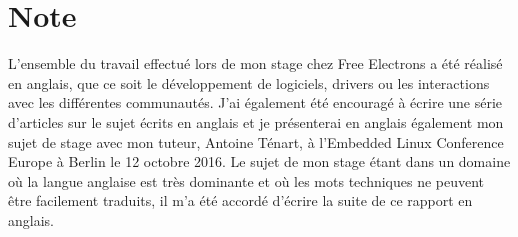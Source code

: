 \chapter*{Note}

L'ensemble du travail effectué lors de mon stage chez Free Electrons a été réalisé en anglais, que ce soit le développement de logiciels, drivers ou les interactions avec les différentes communautés. J'ai également été encouragé à écrire une série d'articles sur le sujet écrits en anglais et je présenterai en anglais également mon sujet de stage avec mon tuteur, Antoine Ténart, à l'Embedded Linux Conference Europe à Berlin le 12 octobre 2016. Le sujet de mon stage étant dans un domaine où la langue anglaise est très dominante et où les mots techniques ne peuvent être facilement traduits, il m'a été accordé d'écrire la suite de ce rapport en anglais.
